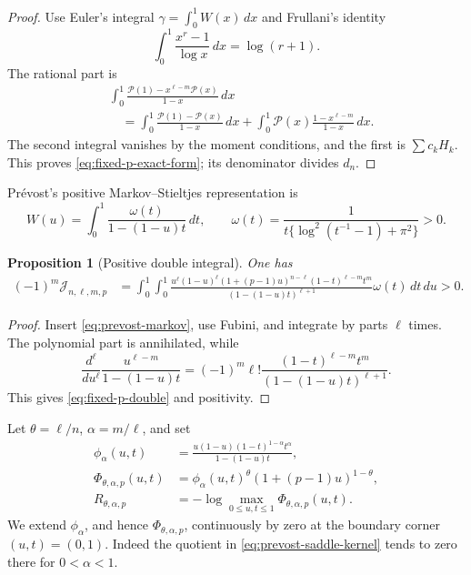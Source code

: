 \documentclass[11pt]{article}
\theoremstyle{keio}
\newtheorem{proposition}[theorem]{Proposition}
\theoremstyle{definition}
\theoremstyle{remark}
\begin{document}
\begin{proof}
Use Euler's integral \(\gamma=\int_0^1W(x)\,dx\) and Frullani's identity
\[
 \int_0^1\frac{x^r-1}{\log x}\,dx=\log(r+1).
\]
The rational part is
\begin{align*}
 &\int_0^1\frac{\mathcal P(1)-x^{\ell-m}\mathcal P(x)}{1-x}\,dx\\
 &\quad=\int_0^1\frac{\mathcal P(1)-\mathcal P(x)}{1-x}\,dx
 +\int_0^1\mathcal P(x)\frac{1-x^{\ell-m}}{1-x}\,dx.
\end{align*}
The second integral vanishes by the moment conditions, and the first is
\(\sum c_kH_k\).  This proves \eqref{eq:fixed-p-exact-form}; its denominator
divides \(d_n\).
\end{proof}

Pr\'evost's positive Markov--Stieltjes representation is
\begin{equation}\label{eq:prevost-markov}
 W(u)=\int_0^1\frac{\omega(t)}{1-(1-u)t}\,dt,
 \qquad
 \omega(t)=\frac1{t\{\log^2(t^{-1}-1)+\pi^2\}}>0.
\end{equation}

\begin{proposition}[Positive double integral]
\label{prop:fixed-p-positive}
One has
\begin{align}
 (-1)^m\mathcal J_{n,\ell,m,p}
 &=\int_0^1\!\int_0^1
 \frac{u^\ell(1-u)^\ell
 (1+(p-1)u)^{n-\ell}
 (1-t)^{\ell-m}t^m}
 {(1-(1-u)t)^{\ell+1}}
 \omega(t)\,dt\,du>0.
 \label{eq:fixed-p-double}
\end{align}
\end{proposition}

\begin{proof}
Insert \eqref{eq:prevost-markov}, use Fubini, and integrate by parts
\(\ell\) times.  The polynomial part is annihilated, while
\[
 \frac{d^\ell}{du^\ell}
 \frac{u^{\ell-m}}{1-(1-u)t}
 =(-1)^m\ell!\frac{(1-t)^{\ell-m}t^m}
 {(1-(1-u)t)^{\ell+1}}.
\]
This gives \eqref{eq:fixed-p-double} and positivity.
\end{proof}

Let \(\theta=\ell/n\), \(\alpha=m/\ell\), and set
\begin{align}
 \phi_\alpha(u,t)&=
 \frac{u(1-u)(1-t)^{1-\alpha}t^\alpha}
 {1-(1-u)t},\label{eq:prevost-saddle-kernel}\\
 \Phi_{\theta,\alpha,p}(u,t)&=
 \phi_\alpha(u,t)^\theta
 (1+(p-1)u)^{1-\theta},\label{eq:fixed-p-saddle}\\
 R_{\theta,\alpha,p}&=-\log\max_{0\le u,t\le1}
 \Phi_{\theta,\alpha,p}(u,t).
\end{align}
We extend \(\phi_\alpha\), and hence
\(\Phi_{\theta,\alpha,p}\), continuously by zero at the boundary corner
\((u,t)=(0,1)\).  Indeed the quotient in
\eqref{eq:prevost-saddle-kernel} tends to zero there for
\(0<\alpha<1\).
\end{document}
